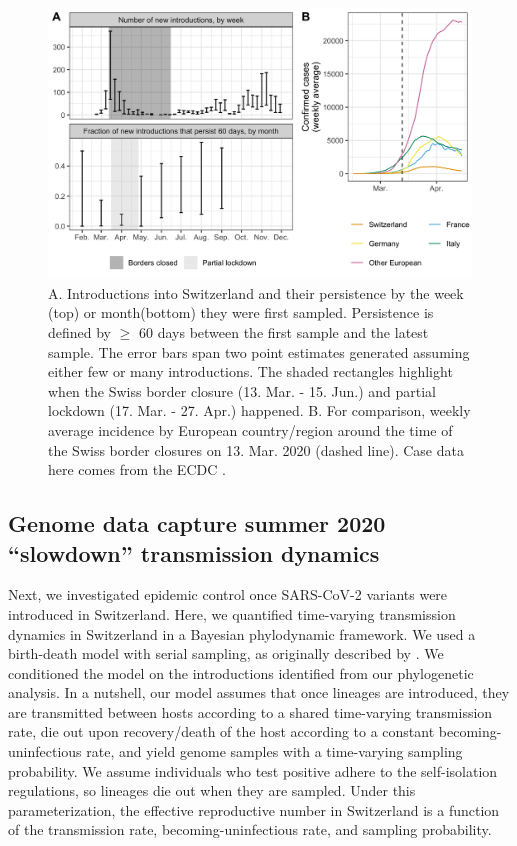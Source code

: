 \documentclass[11pt,twoside,lineno]{pnas-new} %
\begin{document}
\begin{figure}[H]
\centering
\includegraphics[width=0.75\linewidth]{figures/introductions_and_persistence.png}
\caption{A. Introductions into Switzerland and their persistence by the week (top) or month(bottom) they were first sampled. Persistence is defined by $\geq$ 60 days between the first sample and the latest sample. The error bars span two point estimates generated assuming either few or many introductions. The shaded rectangles highlight when the Swiss border closure (13. Mar. - 15. Jun.) and partial lockdown (17. Mar. - 27. Apr.) happened. B. For comparison, weekly average incidence by European country/region around the time of the Swiss border closures on 13. Mar. 2020 (dashed line). Case data here comes from the ECDC \cite{ECDC}.}
\label{fig:chain-longevity}
\end{figure}

\subsection{Genome data capture summer 2020 ``slowdown'' transmission dynamics}

Next, we investigated epidemic control once SARS-CoV-2 variants were introduced in Switzerland. Here, we quantified time-varying transmission dynamics in Switzerland in a Bayesian phylodynamic framework. We used a birth-death model with serial sampling, as originally described by \cite{stadler_2010_bds}. We conditioned the model on the introductions identified from our phylogenetic analysis. In a nutshell, our model assumes that once lineages are introduced, they are transmitted between hosts according to a shared time-varying transmission rate, die out upon recovery/death of the host according to a constant becoming-uninfectious rate, and yield genome samples with a time-varying sampling probability. We assume individuals who test positive adhere to the self-isolation regulations, so lineages die out when they are sampled. Under this parameterization, the effective reproductive number in Switzerland is a function of the transmission rate, becoming-uninfectious rate, and sampling probability.
\end{document}

